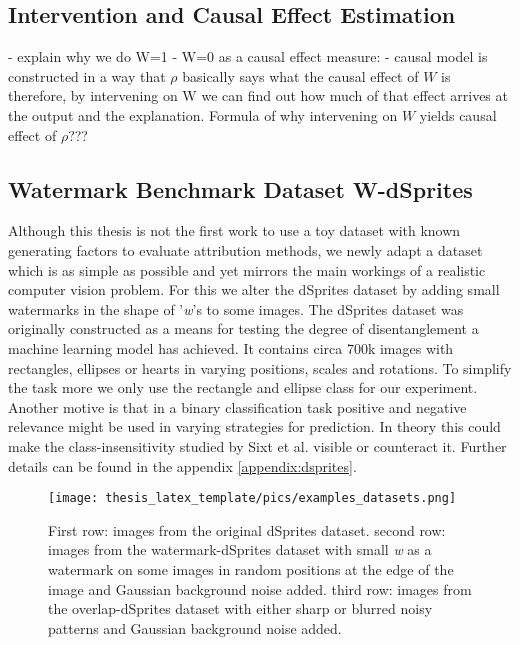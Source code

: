 \subsection{Intervention and Causal Effect Estimation}
- explain why we do W=1 - W=0 as a causal effect measure:
- causal model is constructed in a way that $\rho$ basically says what the causal effect of $W$ is
therefore, by intervening on W we can find out how much of that effect arrives at the output and the explanation. 
Formula of why intervening on $W$ yields causal effect of $\rho$???


\subsection{Watermark Benchmark Dataset W-dSprites}\label{section:dataset_wdsprites}
Although this thesis is not the first work to use a toy dataset with known generating factors to evaluate attribution methods, we newly adapt a dataset which is as simple as possible and yet mirrors the main workings of a realistic computer vision problem. For this we alter the dSprites dataset \cite{dsprites17} by adding small watermarks in the shape of '\textit{w}'s to some images. The dSprites dataset was originally constructed as a means for testing the degree of disentanglement a machine learning model has achieved. It contains circa 700k images with rectangles, ellipses or hearts in varying positions, scales and rotations. To simplify the task more we only use the rectangle and ellipse class for our experiment. Another motive is that in a binary classification task positive and negative relevance might be used in varying strategies for prediction. In theory this could make the class-insensitivity studied by Sixt et al. \cite{Sixt2020} visible or counteract it. Further details can be found in the appendix \cref{appendix:dsprites}.

\begin{figure}[t!]
    \centering
    \texttt{[image: thesis\_latex\_template/pics/examples\_datasets.png]}
    \caption[Example Images W-dSprites Watermark Scenario]{First row: images from the original dSprites dataset. 
    second row: images from the watermark-dSprites dataset with small \textit{w} as a watermark on some images in random positions at the edge of the image and Gaussian background noise added. 
    third row: images from the overlap-dSprites dataset with either sharp or blurred noisy patterns and Gaussian background noise added.}
    \label{fig:dsprites_examples}
\end{figure}

